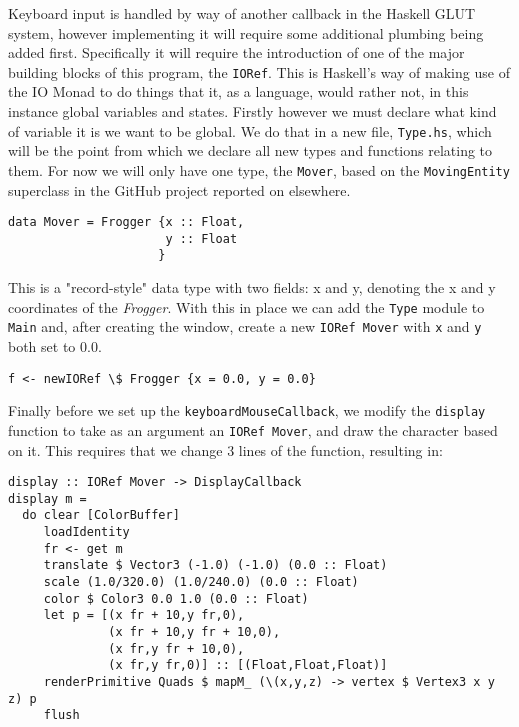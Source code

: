\documentclass[12pt, a4paper]{report}
\begin{document}
Keyboard input is handled by way of another callback in the Haskell GLUT system, however implementing it will require some additional plumbing being added first.
Specifically it will require the introduction of one of the major building blocks of this program, the \verb|IORef|.
This is Haskell's way of making use of the IO Monad to do things that it, as a language, would rather not, in this instance global variables and states.
Firstly however we must declare what kind of variable it is we want to be global.
We do that in a new file, \verb|Type.hs|, which will be the point from which we declare all new types and functions relating to them.
For now we will only have one type, the \verb|Mover|, based on the \verb|MovingEntity| superclass in the GitHub project reported on elsewhere.

\begin{lstlisting}
data Mover = Frogger {x :: Float,
                      y :: Float
                     }
\end{lstlisting}

This is a "record-style" data type with two fields: x and y, denoting the x and y coordinates of the \textit{Frogger}.
With this in place we can add the \verb|Type| module to \verb|Main| and, after creating the window, create a new \verb|IORef Mover| with \verb|x| and \verb|y| both set to 0.0.

\begin{lstlisting}
f <- newIORef \$ Frogger {x = 0.0, y = 0.0}
\end{lstlisting}

Finally before we set up the \verb|keyboardMouseCallback|, we modify the \verb|display| function to take as an argument an \verb|IORef Mover|, and draw the character based on it.
This requires that we change 3 lines of the function, resulting in:

\begin{lstlisting}
display :: IORef Mover -> DisplayCallback
display m =
  do clear [ColorBuffer]
     loadIdentity
     fr <- get m
     translate $ Vector3 (-1.0) (-1.0) (0.0 :: Float)
     scale (1.0/320.0) (1.0/240.0) (0.0 :: Float)
     color $ Color3 0.0 1.0 (0.0 :: Float)
     let p = [(x fr + 10,y fr,0),
              (x fr + 10,y fr + 10,0),
              (x fr,y fr + 10,0),
              (x fr,y fr,0)] :: [(Float,Float,Float)]
     renderPrimitive Quads $ mapM_ (\(x,y,z) -> vertex $ Vertex3 x y z) p
     flush
\end{lstlisting}
\end{document}
